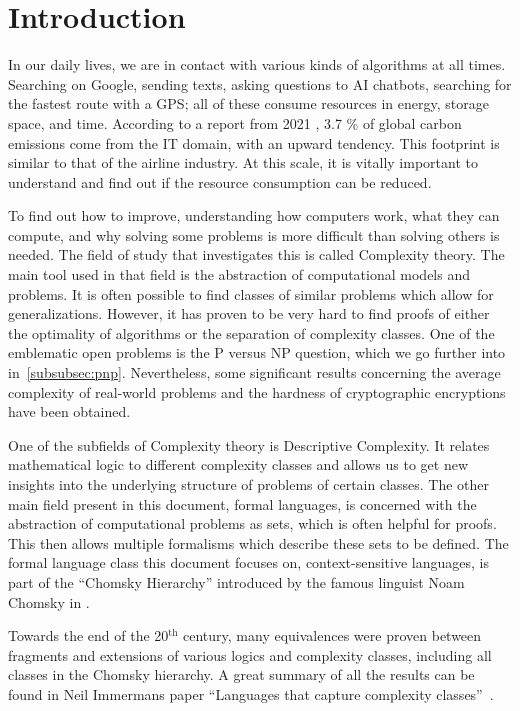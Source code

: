 \chapter{Introduction}\label{ch:intro}

In our daily lives, we are in contact with various kinds of algorithms at all times.
Searching on Google, sending texts, asking questions to \acs{AI} chatbots, searching for the fastest route with a \acs{GPS}; all of these consume resources in energy, storage space, and time.
According to a report from 2021 \cite{webFootprint}, 3.7 \% of global carbon emissions come from the \acs{IT} domain, with an upward tendency.
This footprint is similar to that of the airline industry.
At this scale, it is vitally important to understand and find out if the resource consumption can be reduced.

To find out how to improve, understanding how computers work, what they can compute, and why solving some problems is more difficult than solving others is needed.
The field of study that investigates this is called Complexity theory.
The main tool used in that field is the abstraction of computational models and problems.
It is often possible to find classes of similar problems which allow for generalizations.
However, it has proven to be very hard to find proofs of either the optimality of algorithms or the separation of complexity classes.
One of the emblematic open problems is the P versus NP question, which we go further into in~\cref{subsubsec:pnp}.
Nevertheless, some significant results concerning the average complexity of real-world problems and the hardness of cryptographic encryptions have been obtained.

One of the subfields of Complexity theory is Descriptive Complexity.
It relates mathematical logic to different complexity classes and allows us to get new insights into the underlying structure of problems of certain classes.
The other main field present in this document, formal languages, is concerned with the abstraction of computational problems as sets, which is often helpful for proofs.
This then allows multiple formalisms which describe these sets to be defined.
The formal language class this document focuses on, context-sensitive languages, is part of the ``Chomsky Hierarchy'' introduced by the famous linguist Noam Chomsky in \cite{Chomsky1959}.

Towards the end of the 20$^{\text{th}}$ century, many equivalences were proven between fragments and extensions of various logics and complexity classes, including all classes in the Chomsky hierarchy.
A great summary of all the results can be found in Neil Immermans paper ``Languages that capture complexity classes''~\cite{Immerman1987}.

